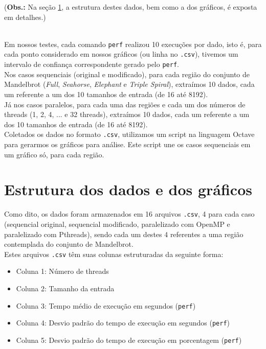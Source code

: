 \documentclass[a4paper, 12pt]{article}
\begin{document}
\noindent\begin{small}
(\textbf{Obs.:} Na seção \ref{section:estrutura}, a estrutura destes dados, bem como a dos gráficos, é exposta em detalhes.)
\end{small}\\

Em nossos testes, cada comando \texttt{perf} realizou 10 execuções por dado, isto é, para cada ponto considerado em nossos gráficos (ou linha no \texttt{.csv}), tivemos um intervalo de confiança correspondente gerado pelo \texttt{perf}.\\

Nos casos sequenciais (original e modificado), para cada região do conjunto de Mandelbrot (\textit{Full}, \textit{Seahorse}, \textit{Elephant} e \textit{Triple Spiral}), extraímos 10 dados, cada um referente a um dos 10 tamanhos de entrada (de 16 até 8192).\\

Já nos casos paralelos, para cada uma das regiões e cada um dos números de threads (1, 2, 4, ... e 32 threads), extraímos 10 dados, cada um referente a um dos 10 tamanhos de entrada (de 16 até 8192).\\

Coletados os dados no formato \texttt{.csv}, utilizamos um script na linguagem Octave para gerarmos os gráficos para análise. Este script une os casos sequenciais em um gráfico só, para cada região.\\

\section{Estrutura dos dados e dos gráficos}\label{section:estrutura}

Como dito, os dados foram armazenados em 16 arquivos \texttt{.csv}, 4 para cada caso (sequencial original, sequencial modificado, paralelizado com OpenMP e paralelizado com Pthreads), sendo cada um destes 4 referentes a uma região contemplada do conjunto de Mandelbrot.\\

Estes arquivos \texttt{.csv} têm suas colunas estruturadas da seguinte forma:
\begin{itemize}
\item Coluna 1: Número de threads
\item Coluna 2: Tamanho da entrada
\item Coluna 3: Tempo médio de execução em segundos (\texttt{perf})
\item Coluna 4: Desvio padrão do tempo de execução em segundos (\texttt{perf})
\item Coluna 5: Desvio padrão do tempo de execução em porcentagem (\texttt{perf})
\end{itemize}
\end{document}
